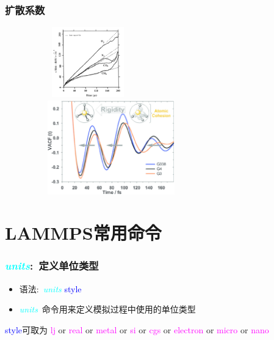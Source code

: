 \frame
{
	\frametitle{扩散系数}
\begin{figure}[h!]
\centering
\vspace*{-0.2in}
\includegraphics[height=1.2in,width=2.0in,viewport=0 0 350 300,clip]{Figures/MSD_O2-N2-CO2-CH4.png}\\
\includegraphics[height=1.6in,width=2.8in,viewport=0 0 230 160,clip]{Figures/The-velocity-autocorrelation-function-VACF-of-the-Al-atoms-showing-the-increase-of-rigidity of the local Al-coordination-for-G3-G4-and-G338-glasses.png}
\label{MSD-VACF}
\end{figure}
}

\section{\rm{LAMMPS}常用命令}
\frame
{
	\frametitle{\textcolor{cyan}{\textit{units}}:~定义单位类型}
	\begin{itemize}
		\item 语法:~\textcolor{cyan}{\textit{units}} \textrm{\textcolor{blue}{style}}
		\item \textcolor{cyan}{\textit{units}}~命令用来定义模拟过程中使用的单位类型\\
			{\fontsize{7.5pt}{5.2pt}}
	\end{itemize}
\textrm{\textcolor{blue}{style}}可取为
\vskip 2pt
\textrm{\textcolor{magenta}{lj} or \textcolor{magenta}{real} or \textcolor{magenta}{metal} or \textcolor{magenta}{si} or \textcolor{magenta}{cgs} or \textcolor{magenta}{electron} or \textcolor{magenta}{micro} or \textcolor{magenta}{nano}}
\vskip 2pt
{\fontsize{7.5pt}{5.2pt}}
}

